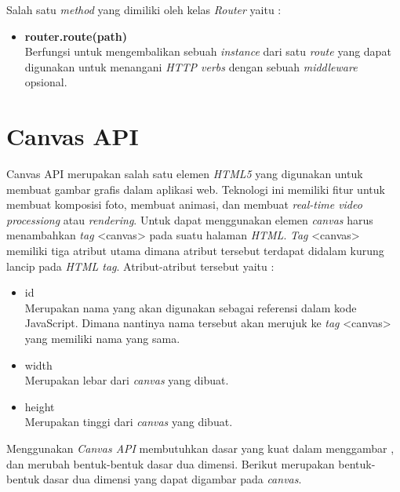 Salah satu \textit{method} yang dimiliki oleh kelas \textit{Router} yaitu : 

\begin{itemize}
	\item \textbf{router.route(path)} \\ Berfungsi untuk mengembalikan sebuah \textit{instance} dari satu \textit{route} yang dapat digunakan untuk menangani \textit{HTTP verbs} dengan sebuah \textit{middleware} opsional.
\end{itemize}


\section{Canvas API}
\label{sec:Canvas API}
 
Canvas API merupakan salah satu elemen \textit{HTML5} yang digunakan untuk membuat gambar grafis dalam aplikasi web. Teknologi ini memiliki fitur untuk membuat komposisi foto, membuat animasi, dan membuat \textit{real-time video processiong} atau \textit{rendering}. Untuk dapat menggunakan elemen \textit{canvas} harus menambahkan \textit{tag} <canvas> pada suatu halaman \textit{HTML}. \textit{Tag} <canvas> memiliki tiga atribut utama dimana atribut tersebut terdapat didalam kurung lancip pada \textit{HTML tag}. Atribut-atribut tersebut yaitu : 

\begin{itemize}
	\item id \\
	Merupakan nama yang akan digunakan sebagai referensi dalam kode JavaScript. Dimana nantinya nama tersebut akan merujuk ke \textit{tag} <canvas> yang memiliki nama yang sama.
	\item width \\
	Merupakan lebar dari \textit{canvas} yang dibuat.
	\item height \\
	Merupakan tinggi dari \textit{canvas} yang dibuat.
\end{itemize}

Menggunakan \textit{Canvas API} membutuhkan dasar yang kuat dalam menggambar , dan merubah bentuk-bentuk dasar dua dimensi. Berikut merupakan bentuk-bentuk dasar dua dimensi yang dapat digambar pada \textit{canvas}.

